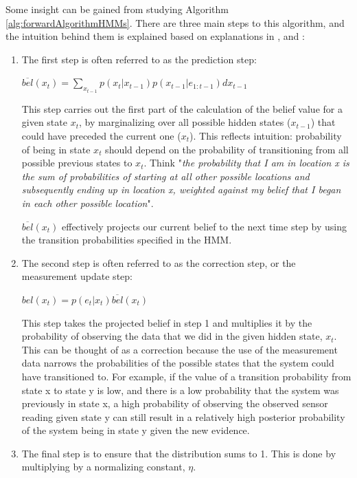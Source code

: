 Some insight can be gained from studying Algorithm \ref{alg:forwardAlgorithmHMMs}. There are three main steps to this algorithm, and the intuition behind them is explained based on explanations in \cite{AIAMA}, \cite{Thrun:2005:ProbabilisticRobotics} and \cite{Murphy1994DynamicLearning}: 
\begin{enumerate}
    
    \item The first step is often referred to as the prediction step:
    \begin{center}
    $\overline{bel}(x_t) = \sum_{x_{t-1}} p(x_t | x_{t-1}) p(x_{t-1} | e_{1:t-1}) d x_{t-1}$
    \end{center}

    This step carries out the first part of the calculation of the belief value for a given state $x_t$, by marginalizing over all possible hidden states ($x_{t-1}$) that could have preceded the current one ($x_t$). This reflects intuition: probability of being in state $x_t$ should depend on the probability of transitioning from all possible previous states to $x_t$. 
    Think "\textit{the probability that I am in location x is the sum of probabilities of starting at all other possible locations and subsequently ending up in location x, weighted against my belief that I began in each other possible location}".
    
    $\overline{bel}(x_t)$ effectively projects our current belief to the next time step by using the transition probabilities specified in the HMM.
    
    \item The second step is often referred to as the correction step, or the measurement update step: 
    \begin{center}
    $bel(x_t) = p(e_t | x_t) \overline{bel}(x_t)$ 
    \end{center}
    This step takes the projected belief in step 1 and multiplies it by the probability of observing the data that we did in the given hidden state, $x_t$. This can be thought of as a correction because the use of the measurement data narrows the probabilities of the possible states that the system could have transitioned to. 
    For example, if the value of a transition probability from state x to state y is low, and there is a low probability that the system was previously in state x, a high probability of observing the observed sensor reading given state y can still result in a relatively high posterior probability of the system being in state y given the new evidence.
    
    \item The final step is to ensure that the distribution sums to 1. This is done by multiplying by a normalizing constant, $\eta$.
    
    
\end{enumerate}
